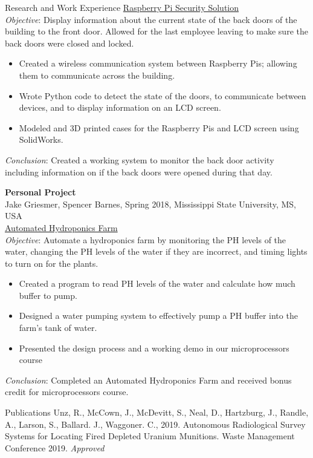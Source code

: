 \documentclass{resume} %
\begin{document}
\begin{rSection}{Research and Work Experience}
{\underline{Raspberry Pi Security Solution}}
\smallskip
\\{\em Objective}: Display information about the current state of the back doors of the building to the front door. Allowed for the last employee leaving to make sure the back doors were closed and locked.
\begin{itemize}
    \item Created a wireless communication system between Raspberry Pis; allowing them to communicate across the building. 
    \item Wrote Python code to detect the state of the doors, to communicate between devices, and to display information on an LCD screen. 
    \item Modeled and 3D printed cases for the Raspberry Pis and LCD screen using SolidWorks.
\end{itemize}
{\em Conclusion}: Created a working system to monitor the back door activity including information on if the back doors were opened during that day.  

{\bf Personal Project}
\\Jake Griesmer, Spencer Barnes, Spring 2018, Mississippi State University, MS, USA
\\{\underline{Automated Hydroponics Farm}}
\smallskip
\\{\em Objective}: Automate a hydroponics farm by monitoring the PH levels of the water, changing the PH levels of the water if they are incorrect, and timing lights to turn on for the plants. 
\begin{itemize}
    \item Created a program to read PH levels of the water and calculate how much buffer to pump.  
    \item Designed a water pumping system to effectively pump a PH buffer into the farm's tank of water. 
    \item Presented the design process and a working demo in our microprocessors course
\end{itemize}
{\em Conclusion}: Completed an Automated Hydroponics Farm and received bonus credit for microprocessors course. 



\end{rSection}
\newpage
\begin{rSection}{Publications}
Unz, R., McCown, J., McDevitt, S., Neal, D., Hartzburg, J., Randle, A., Larson, S., Ballard. J., Waggoner. C.,   2019.  Autonomous Radiological Survey Systems for Locating Fired Depleted Uranium Munitions. Waste Management Conference 2019. {\em Approved}

\end{rSection}
\end{document}
